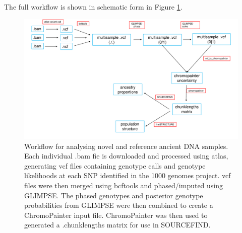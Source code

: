 The full workflow is shown in schematic form in Figure \ref{fig:workflow_slav}.

\begin{figure}[htp]
    \centering
    \includegraphics[width=1.0\textwidth]{../images/chapter4/workflow.pdf}
    \caption{Workflow for analysing novel and reference ancient DNA samples. Each individual .bam fie is downloaded and processed using atlas, generating vcf files containing genotype calls and genotype likelihoods at each SNP identified in the 1000 genomes project. vcf files were then merged using bcftools and phased/imputed using GLIMPSE. The phased genotypes and posterior genotype probabilities from GLIMPSE were then combined to create a ChromoPainter input file. ChromoPainter was then used to generated a .chunklengths matrix for use in SOURCEFIND.}
    \label{fig:workflow_slav}
\end{figure}


